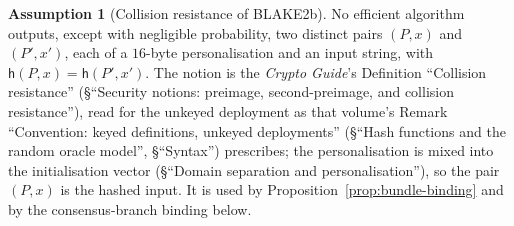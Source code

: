 \documentclass[11pt,a4paper]{article}
\theoremstyle{definition}
\newtheorem{assumption}[theorem]{Assumption}
\begin{document}
\begin{assumption}[Collision resistance of BLAKE2b]\label{ass:blake2b-cr}
No efficient algorithm outputs, except with negligible probability, two
distinct pairs $(P, x)$ and $(P', x')$, each of a $16$-byte personalisation
and an input string, with $\mathsf{h}(P, x) = \mathsf{h}(P', x')$. The notion
is the \emph{Crypto Guide}'s Definition ``Collision resistance''
(\S``Security notions: preimage, second-preimage, and collision
resistance''), read for the unkeyed deployment as that volume's Remark
``Convention: keyed definitions, unkeyed deployments'' (\S``Hash functions
and the random oracle model'', \S``Syntax'') prescribes; the
personalisation is mixed into the initialisation vector (\S``Domain
separation and personalisation''), so the pair $(P, x)$ is the hashed input.
It is used by Proposition~\ref{prop:bundle-binding} and by the
consensus-branch binding below.
\end{assumption}
\end{document}
